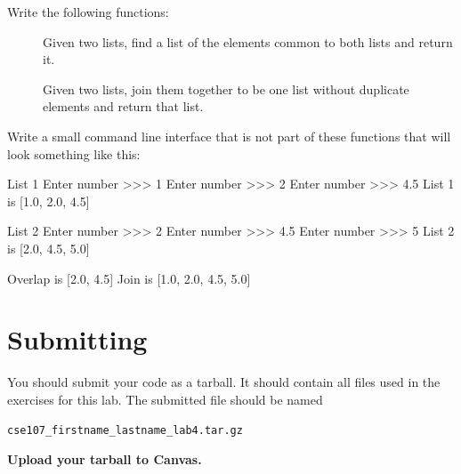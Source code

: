 \documentclass[11pt]{cselabheader}
\begin{document}
\begin{ex}[sets.py]
  Write the following functions:

  \begin{description}
    \item[] Given two lists, find a list of the elements
      common to both lists and return it.
    \item[] Given two lists, join them together to be one
      list without duplicate elements and return that list.
  \end{description}

  Write a small command line interface that is not part of these functions that
  will look something like this:

  \begin{verbatimcode}
List 1
Enter number >>> 1
Enter number >>> 2
Enter number >>> 4.5
List 1 is [1.0, 2.0, 4.5]

List 2
Enter number >>> 2
Enter number >>> 4.5
Enter number >>> 5
List 2 is [2.0, 4.5, 5.0]

Overlap is [2.0, 4.5]
Join is [1.0, 2.0, 4.5, 5.0]
  \end{verbatimcode}

\end{ex}

\pagebreak
\section{Submitting}

You should submit your code as a tarball. It should contain all files
used in the exercises for this lab. The submitted file should be named
\begin{center}
  \texttt{cse107\_firstname\_lastname\_lab4.tar.gz}
\end{center}

\begin{center}
  \textbf{Upload your tarball to Canvas.}
\end{center}

\listoftheorems
\end{document}
